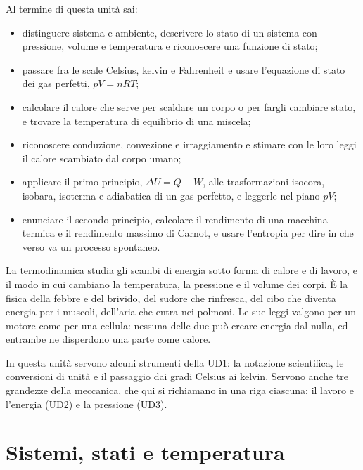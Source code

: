 \dispensa

\begin{tcolorbox}[fisbox={formula}{formulaBg},title={Obiettivi dell'unità}]
Al termine di questa unità sai:
\begin{itemize}
  \item distinguere sistema e ambiente, descrivere lo stato di un sistema con pressione, volume e temperatura e riconoscere una funzione di stato;
  \item passare fra le scale Celsius, kelvin e Fahrenheit e usare l'equazione di stato dei gas perfetti, $pV = nRT$;
  \item calcolare il calore che serve per scaldare un corpo o per fargli cambiare stato, e trovare la temperatura di equilibrio di una miscela;
  \item riconoscere conduzione, convezione e irraggiamento e stimare con le loro leggi il calore scambiato dal corpo umano;
  \item applicare il primo principio, $\Delta U = Q - W$, alle trasformazioni isocora, isobara, isoterma e adiabatica di un gas perfetto, e leggerle nel piano $pV$;
  \item enunciare il secondo principio, calcolare il rendimento di una macchina termica e il rendimento massimo di Carnot, e usare l'entropia per dire in che verso va un processo spontaneo.
\end{itemize}
\end{tcolorbox}

La termodinamica studia gli scambi di energia sotto forma di calore e di lavoro, e il modo in cui cambiano la temperatura, la pressione e il volume dei corpi. È la fisica della febbre e del brivido, del sudore che rinfresca, del cibo che diventa energia per i muscoli, dell'aria che entra nei polmoni. Le sue leggi valgono per un motore come per una cellula: nessuna delle due può creare energia dal nulla, ed entrambe ne disperdono una parte come calore.

In questa unità servono alcuni strumenti della UD1: la notazione scientifica, le conversioni di unità e il passaggio dai gradi Celsius ai kelvin. Servono anche tre grandezze della meccanica, che qui si richiamano in una riga ciascuna: il lavoro e l'energia (UD2) e la pressione (UD3).

\section{Sistemi, stati e temperatura}
\label{sec:ud5-stato}

